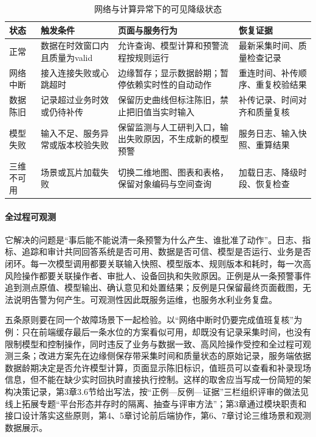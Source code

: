 \begin{table}[htbp]
\centering
\caption{网络与计算异常下的可见降级状态}
\label{tab:ch01-degrade-state}
\begin{tabular}{p{2.2cm}p{3.0cm}p{4.5cm}p{3.8cm}}
\toprule
状态 & 触发条件 & 页面与服务行为 & 恢复证据 \\
\midrule
正常 & 数据在时效窗口内且质量为valid & 允许查询、模型计算和预警流程按规则运行 & 最新采集时间、质量检查记录 \\
网络中断 & 接入连接失败或心跳超时 & 边缘暂存；显示数据龄期；暂停依赖实时性的自动动作 & 重连时间、补传顺序、重复校验结果 \\
数据陈旧 & 记录超过业务时效或仍待补传 & 保留历史曲线但标注陈旧，禁止把旧值当实时输入 & 补传记录、时间对齐和质量复核 \\
模型失败 & 输入不足、服务异常或版本校验失败 & 保留监测与人工研判入口，输出失败原因，不生成新的模型预警 & 服务日志、输入快照、重算结果 \\
三维不可用 & 场景或瓦片加载失败 & 切换二维地图、图表和表格，保留对象编码与空间查询 & 加载日志、降级时段、恢复检查 \\
\bottomrule
\end{tabular}
\end{table}

\paragraph{全过程可观测}
它解决的问题是“事后能不能说清一条预警为什么产生、谁批准了动作”。日志、指标、追踪和审计共同回答系统是否可用、数据是否可信、模型是否运行、业务是否闭环。每一次模型调用都要关联输入快照、模型版本、规则版本和耗时，每一次高风险操作都要关联操作者、审批人、设备回执和失败原因。正例是从一条预警事件追到测点原值、模型输出、确认意见和处置结果；反例是只保留最终页面截图，无法说明告警为何产生。可观测性因此既服务运维，也服务水利业务复盘。

五条原则要在同一个故障场景下一起检验。以“网络中断时仍要完成值班复核”为例：只在前端缓存最后一条水位的方案看似可用，却既没有记录采集时间，也没有限制模型和控制操作，同时违反了业务与数据一致、高风险操作受控和全过程可观测三条；改进方案先在边缘侧保存带采集时间和质量状态的原始记录，服务端依据数据龄期决定是否允许模型计算，页面显示陈旧标识，值班员可以查看和补录现场信息，但不能在缺少实时回执时直接执行控制。这样的取舍应当写成一份简短的架构决策记录，第3章3.6节给出写法，按“正例—反例—证据”三栏组织评审的做法见线上拓展专题“平台形态并存时的隔离、抽查与评审方法”；第3章通过模块职责和接口设计落实这些原则，第4、5章讨论前后端协作，第6、7章讨论三维场景和观测数据展示。

